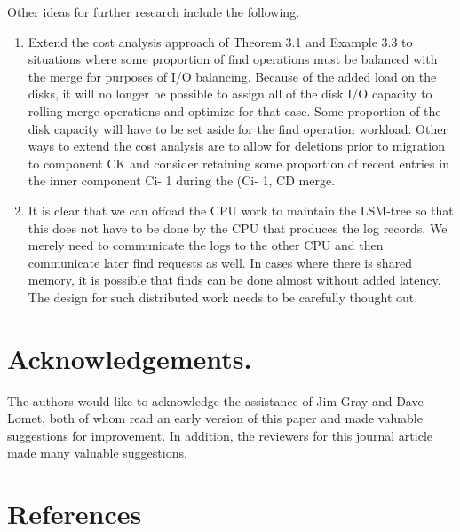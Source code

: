\documentclass[a4paper,12pt,notitlepage,twoside,openright]{article}
\begin{document}
Other ideas for further research include the following.


\begin{enumerate}
\def\labelenumi{(\arabic{enumi})}
\item
  Extend the cost analysis approach of Theorem 3.1 and Example 3.3 to
  situations where some proportion of find operations must be balanced
  with the merge for purposes of I/O balancing. Because of the added
  load on the disks, it will no longer be possible to assign all of the
  disk I/O capacity to rolling merge operations and optimize for that
  case. Some proportion of the disk capacity will have to be set aside
  for the find operation workload. Other ways to extend the cost
  analysis are to allow for deletions prior to migration to component CK
  and consider retaining some proportion of recent entries in the inner
  component Ci- 1 during the (Ci- 1, CD merge.
\item
  It is clear that we can offoad the CPU work to maintain the LSM-tree
  so that this does not have to be done by the CPU that produces the log
  records. We merely need to communicate the logs to the other CPU and
  then communicate later find requests as well. In cases where there is
  shared memory, it is possible that finds can be done almost without
  added latency. The design for such distributed work needs to be
  carefully thought out.
\end{enumerate}

\hypertarget{acknowledgements.}{%
\section{Acknowledgements.}\label{acknowledgements.}}


The authors would like to acknowledge the assistance of Jim Gray and
Dave Lomet, both of whom read an early version of this paper and made
valuable suggestions for improvement. In addition, the reviewers for
this journal article made many valuable suggestions.


\hypertarget{references}{%
\section{References}\label{references}}
\end{document}

